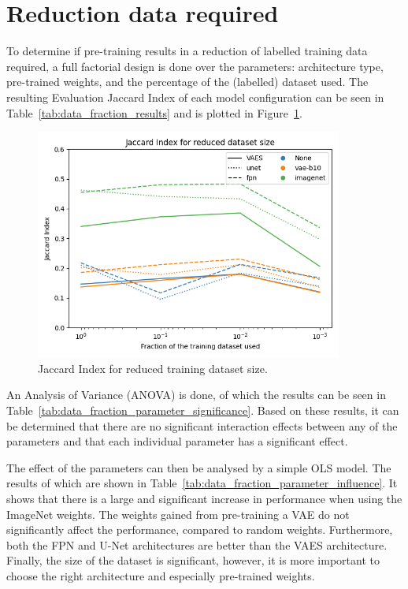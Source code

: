 

\section{Reduction data required}
To determine if pre-training results in a reduction of labelled training data required, a full factorial design is done over the parameters: architecture type, pre-trained weights, and the percentage of the (labelled) dataset used. The resulting Evaluation Jaccard Index of each model configuration can be seen in Table~\ref{tab:data_fraction_results} and is plotted in Figure~\ref{fig:dataset-fraction-results}.


\begin{figure}[h]
    \centering
    \includegraphics[width=0.9\textwidth]{figures/data_percentage/line-plot.png}
    \caption{Jaccard Index for reduced training dataset size.}
    \label{fig:dataset-fraction-results}
\end{figure}

An Analysis of Variance (ANOVA) is done, of which the results can be seen in Table~\ref{tab:data_fraction_parameter_significance}. Based on these results, it can be determined that there are no significant interaction effects between any of the parameters and that each individual parameter has a significant effect.


The effect of the parameters can then be analysed by a simple OLS model. The results of which are shown in Table~\ref{tab:data_fraction_parameter_influence}. It shows that there is a large and significant increase in performance when using the ImageNet weights. The weights gained from pre-training a VAE do not significantly affect the performance, compared to random weights. Furthermore, both the FPN and U-Net architectures are better than the VAES architecture. Finally, the size of the dataset is significant, however, it is more important to choose the right architecture and especially pre-trained weights.


